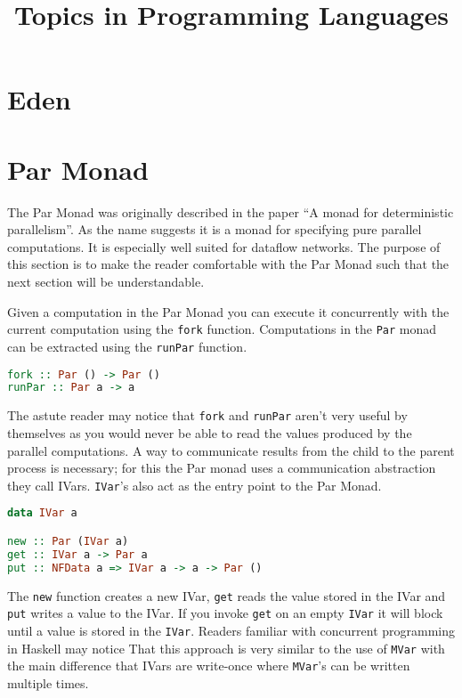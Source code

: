\documentclass[a4paper, oneside, final]{article}
\title{Topics in Programming Languages}
\begin{document}
\maketitle

\section{Eden}

\section{Par Monad}

The Par Monad was originally described in the paper ``A monad for deterministic parallelism''\cite{parmonad}. As the name suggests it is a monad for specifying pure parallel computations. It is especially well suited for dataflow networks. The purpose of this section is to make the reader comfortable with the Par Monad such that the next section will be understandable.

Given a computation in the Par Monad you can execute it concurrently with the current computation using the \texttt{fork} function. Computations in the \texttt{Par} monad can be extracted using the \texttt{runPar} function. \newline

\begin{lstlisting}[language=Haskell, frame=tb, basicstyle=\footnotesize]
fork :: Par () -> Par ()
runPar :: Par a -> a
\end{lstlisting}

The astute reader may notice that \texttt{fork} and \texttt{runPar} aren't very useful by themselves as you would never be able to read the values produced by the parallel computations. A way to communicate results from the child to the parent process is necessary; for this the Par monad uses a communication abstraction they call IVars. \texttt{IVar}'s also act as the entry point to the Par Monad. \newline

\begin{lstlisting}[language=Haskell, frame=tb, basicstyle=\footnotesize]
data IVar a 

new :: Par (IVar a)
get :: IVar a -> Par a
put :: NFData a => IVar a -> a -> Par ()
\end{lstlisting}

The \texttt{new} function creates a new IVar, \texttt{get} reads the value stored in the IVar and \texttt{put} writes a value to the IVar. If you invoke \texttt{get} on an empty \texttt{IVar} it will block until a value is stored in the \texttt{IVar}. Readers familiar with concurrent programming in Haskell may notice That this approach is very similar to the use of \texttt{MVar} with the main difference that IVars are write-once where \texttt{MVar}'s can be written multiple times.
\end{document}
